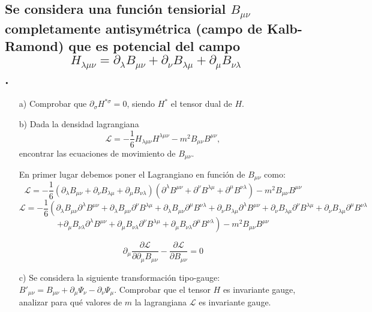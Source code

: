 \documentclass{article}
\begin{document}
\subsection{Se considera una función tensiorial $B_{\mu\nu}$ completamente antisymétrica (campo de Kalb-Ramond) que es potencial del campo \[H_{\lambda\mu\nu } = \partial_{\lambda} B_{\mu\nu } + \partial_{\nu} B_{\lambda\mu} + \partial_{\mu } B_{\nu \lambda }\].}



\begin{enumerate}
    \item[a)] Comprobar que $\partial_{\sigma} H^{* \sigma} = 0$, siendo $H^*$ el tensor dual de $H$.
    \item[b)] Dada la densidad lagrangiana 
    \[
    \mathcal{L} = - \frac{1}{6} H_{\lambda\mu\nu } H^{\lambda\mu\nu } - m^2 B_{\mu\nu} B^{\mu\nu},
    \]
    encontrar las ecuaciones de movimiento de $B_{\mu\nu}$.
    
    En primer lugar debemos poner el Lagrangiano en función de $B_{\mu \nu }$ como:
    \[\mathcal{L}= - \frac{1}{6} \left(\partial_{\lambda} B_{\mu\nu } + \partial_{\nu} B_{\lambda\mu} + \partial_{\mu } B_{\nu \lambda }\right)\left(\partial^{\lambda} B^{\mu\nu } + \partial^{\nu} B^{\lambda\mu} + \partial^{\mu } B^{\nu \lambda }\right)- m^2 B_{\mu\nu} B^{\mu\nu}\]
    \[\mathcal{L}= - \frac{1}{6} \left( \partial_{\lambda} B_{\mu\nu }\partial^{\lambda} B^{\mu\nu } + \partial_{\lambda} B_{\mu\nu }\partial^{\nu} B^{\lambda\mu} +\partial_{\lambda} B_{\mu\nu }\partial^{\mu } B^{\nu \lambda }+\partial_{\nu} B_{\lambda\mu}\partial^{\lambda} B^{\mu\nu } + \partial_{\nu} B_{\lambda\mu}\partial^{\nu} B^{\lambda\mu} +\partial_{\nu} B_{\lambda\mu}\partial^{\mu } B^{\nu \lambda }\right.\]
    \[\left. +\partial_{\mu } B_{\nu \lambda}\partial^{\lambda} B^{\mu\nu } + \partial_{\mu } B_{\nu \lambda}\partial^{\nu} B^{\lambda\mu} +\partial_{\mu } B_{\nu \lambda}\partial^{\mu } B^{\nu \lambda } \right)- m^2 B_{\mu\nu} B^{\mu\nu}\]

    \[\partial_{\mu }\frac{\partial\mathcal{L}}{\partial\partial_{\mu}B_{\mu \nu }}-\frac{\partial\mathcal{L}}{\partial B_{\mu \nu }}=0\]
    \item[c)] Se considera la siguiente transformación tipo-gauge: $B'_{\mu\nu} = B_{\mu\nu} + \partial_{\mu} \Psi_{\nu} - \partial_{\nu} \Psi_{\mu}$.
    Comprobar que el tensor $H$ es invariante gauge, analizar para qué valores de $m$ la lagrangiana $\mathcal{L}$ es invariante gauge.


\end{enumerate}
\end{document}
